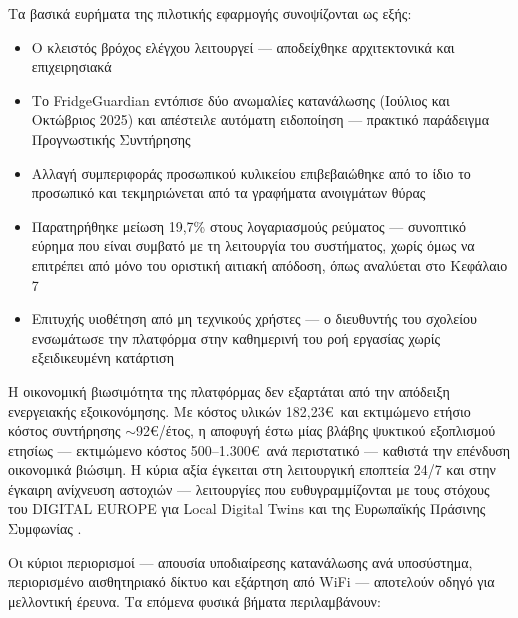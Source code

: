 Τα βασικά ευρήματα της πιλοτικής εφαρμογής συνοψίζονται ως εξής:

\begin{itemize}
\item Ο κλειστός βρόχος ελέγχου λειτουργεί --- αποδείχθηκε αρχιτεκτονικά και επιχειρησιακά
\item Το \textlatin{FridgeGuardian} εντόπισε δύο ανωμαλίες κατανάλωσης (Ιούλιος και Οκτώβριος 2025) και απέστειλε αυτόματη ειδοποίηση --- πρακτικό παράδειγμα Προγνωστικής Συντήρησης
\item Αλλαγή συμπεριφοράς προσωπικού κυλικείου επιβεβαιώθηκε από το ίδιο το προσωπικό και τεκμηριώνεται από τα γραφήματα ανοιγμάτων θύρας
\item Παρατηρήθηκε μείωση 19,7\% στους λογαριασμούς ρεύματος --- συνοπτικό εύρημα που είναι συμβατό με τη λειτουργία του συστήματος, χωρίς όμως να επιτρέπει από μόνο του οριστική αιτιακή απόδοση, όπως αναλύεται στο Κεφάλαιο 7
\item Επιτυχής υιοθέτηση από μη τεχνικούς χρήστες --- ο διευθυντής του σχολείου ενσωμάτωσε την πλατφόρμα στην καθημερινή του ροή εργασίας χωρίς εξειδικευμένη κατάρτιση
\end{itemize}

Η οικονομική βιωσιμότητα της πλατφόρμας δεν εξαρτάται από την απόδειξη ενεργειακής εξοικονόμησης. Με κόστος υλικών 182,23\euro\ και εκτιμώμενο ετήσιο κόστος συντήρησης $\sim$92\euro/έτος, η αποφυγή έστω μίας βλάβης ψυκτικού εξοπλισμού ετησίως --- εκτιμώμενο κόστος 500--1.300\euro\ ανά περιστατικό --- καθιστά την επένδυση οικονομικά βιώσιμη. Η κύρια αξία έγκειται στη λειτουργική εποπτεία 24/7 και στην έγκαιρη ανίχνευση αστοχιών --- λειτουργίες που ευθυγραμμίζονται με τους στόχους του \textlatin{DIGITAL EUROPE} για \textlatin{Local Digital Twins} \cite{EuropeanCommission2023} και της Ευρωπαϊκής Πράσινης Συμφωνίας \cite{EUParliament2024}.

Οι κύριοι περιορισμοί --- απουσία υποδιαίρεσης κατανάλωσης ανά υποσύστημα, περιορισμένο αισθητηριακό δίκτυο και εξάρτηση από \textlatin{WiFi} --- αποτελούν οδηγό για μελλοντική έρευνα. Τα επόμενα φυσικά βήματα περιλαμβάνουν:

